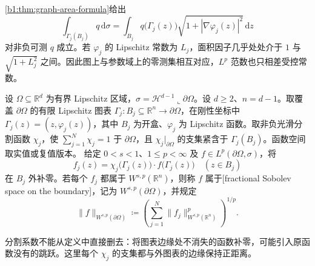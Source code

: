 \cref{b1:thm:graph-area-formula}给出
\[
 \int_{\Gamma_j(B_j)}q\,\mathrm d\sigma
 =\int_{B_j}q\bigl(\Gamma_j(z)\bigr)
       \sqrt{1+|\nabla\varphi_j(z)|^2}\,\mathrm dz
\]
对非负可测 \(q\) 成立。若 \(\varphi_j\) 的 Lipschitz 常数为 \(L_j\)，面积因子几乎处处介于 \(1\) 与 \(\sqrt{1+L_j^2}\) 之间。因此图上与参数域上的零测集相互对应，\(L^p\) 范数也只相差受控常数。

\begin{definition}\label{b1:def:boundary-fractional-sobolev}
设 \(\Omega\subseteq\mathbb R^d\) 为有界 Lipschitz 区域，\(\sigma=\mathcal H^{d-1}\llcorner\partial\Omega\)。设 \(d\geq2\)、\(n=d-1\)。取覆盖 \(\partial\Omega\) 的有限 Lipschitz 图表 \(\Gamma_j:B_j\subseteq\mathbb R^n\to\partial\Omega\)，在刚性坐标中 \(\Gamma_j(z)=(z,\varphi_j(z))\)，其中 \(B_j\) 为开盒、\(\varphi_j\) 为 Lipschitz 函数。取非负光滑分割函数 \(\chi_j\)，使 \(\sum_{j=1}^N\chi_j=1\) 于 \(\partial\Omega\)，且 \(\chi_j|_{\partial\Omega}\) 的支集紧含于 \(\Gamma_j(B_j)\)。函数空间取实值或复值版本。
给定 \(0<s<1\)、\(1\le p<\infty\) 及 \(f\in L^p(\partial\Omega,\sigma)\)，将
\[
 f_j(z)=\chi_j\bigl(\Gamma_j(z)\bigr)\cdot f\bigl(\Gamma_j(z)\bigr)
 \quad(z\in B_j)
\]
在 \(B_j\) 外补零。若每个 \(f_j\) 都属于 \(W^{s,p}(\mathbb R^n)\)，则称 \(f\) 属于[fractional Sobolev space on the boundary]，记为 \(W^{s,p}(\partial\Omega)\)，并规定
\[
 \|f\|_{W^{s,p}(\partial\Omega)}
 \coloneqq\left(\sum_{j=1}^N\|f_j\|_{W^{s,p}(\mathbb R^n)}^p\right)^{1/p}.
\]
\end{definition}

分割系数不能从定义中直接删去：将图表边缘处不消失的函数补零，可能引入原函数没有的跳跃。这里每个 \(\chi_j\) 的支集都与外图表的边缘保持正距离。

